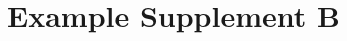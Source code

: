 \documentclass[hidelinks,a4paper,11pt,openany]{article}
\newcommand{\supplementName}{Example Supplement B}
\begin{document}
\section*{\supplementName}




\end{document}
